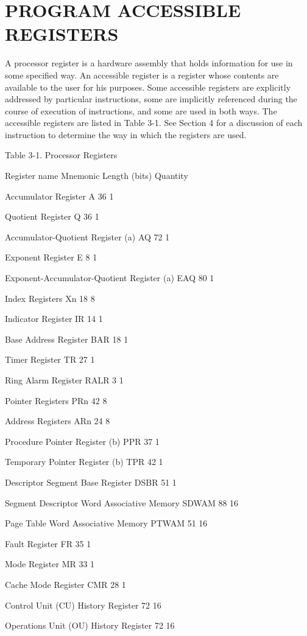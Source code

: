 \section{PROGRAM ACCESSIBLE REGISTERS}

A processor register is a hardware assembly that holds information for use in
some specified way. An accessible register is a register whose contents are
available to the user for his purposes. Some accessible registers are
explicitly addressed by particular instructions, some are implicitly referenced
during the course of execution of instructions, and some are used in both ways.
The accessible registers are listed in Table 3-1. See Section 4 for a
discussion of each instruction to determine the way in which the registers are
used.

Table 3-1. Processor Registers

Register name Mnemonic Length (bits) Quantity

Accumulator Register A 36 1

Quotient Register Q 36 1

Accumulator-Quotient Register (a) AQ 72 1

Exponent Register E 8 1

Exponent-Accumulator-Quotient Register (a) EAQ 80 1

Index Registers Xn 18 8

Indicator Register IR 14 1

Base Address Register BAR 18 1

Timer Register TR 27 1

Ring Alarm Register RALR 3 1

Pointer Registers PRn 42 8

Address Registers ARn 24 8

Procedure Pointer Register (b) PPR 37 1

Temporary Pointer Register (b) TPR 42 1

Descriptor Segment Base Register DSBR 51 1

Segment Descriptor Word Associative Memory SDWAM 88 16

Page Table Word Associative Memory PTWAM 51 16

Fault Register FR 35 1

Mode Register MR 33 1

Cache Mode Register CMR 28 1

Control Unit (CU) History Register 72 16

Operations Unit (OU) History Register 72 16

